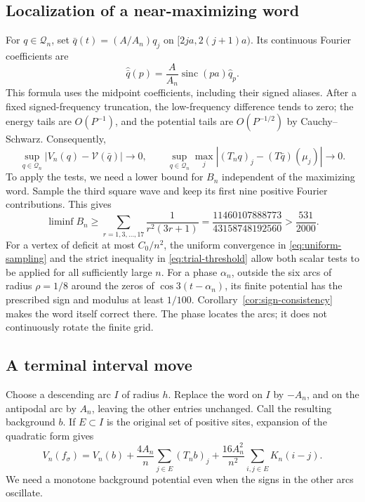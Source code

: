 \documentclass[11pt,reqno]{amsart}
\numberwithin{equation}{section}
\theoremstyle{definition}
\theoremstyle{remark}
\newcommand{\V}{\mathcal V}
\DeclareMathOperator{\sinc}{sinc}
\begin{document}
\subsection{Localization of a near-maximizing word}
For $q\in\mathcal Q_n$, set $\bar q(t)=(A/A_n)q_j$ on $[2ja,2(j+1)a)$. Its continuous Fourier coefficients are
\[
 \widehat{\bar q}(p)=\frac A{A_n}\sinc(pa)\widehat q_p.
\]
This formula uses the midpoint coefficients, including their signed aliases. After a fixed signed-frequency truncation, the low-frequency difference tends to zero; the energy tails are $O(P^{-1})$, and the potential tails are $O(P^{-1/2})$ by Cauchy--Schwarz. Consequently,
\begin{equation}\label{eq:uniform-sampling}
 \sup_{q\in\mathcal Q_n}|V_n(q)-\V(\bar q)|\to0,
 \qquad
 \sup_{q\in\mathcal Q_n}\max_j|(T_nq)_j-(T\bar q)(\mu_j)|\to0.
\end{equation}
To apply the tests, we need a lower bound for $B_n$ independent of the maximizing word. Sample the third square wave and keep its first nine positive Fourier contributions. This gives
\begin{equation}\label{eq:trial-threshold}
 \liminf B_n\ge\sum_{r=1,3,\ldots,17}\frac1{r^2(3r+1)}
 =\frac{11460107888773}{43158748192560}>\frac{531}{2000}.
\end{equation}
For a vertex of deficit at most $C_0/n^2$, the uniform convergence in \eqref{eq:uniform-sampling} and the strict inequality in \eqref{eq:trial-threshold} allow both scalar tests to be applied for all sufficiently large $n$. For a phase $\alpha_n$, outside the six arcs of radius $\rho=1/8$ around the zeros of $\cos3(t-\alpha_n)$, its finite potential has the prescribed sign and modulus at least $1/100$. Corollary~\ref{cor:sign-consistency} makes the word itself correct there. The phase locates the arcs; it does not continuously rotate the finite grid.


\subsection{A terminal interval move}
Choose a descending arc $I$ of radius $h$. Replace the word on $I$ by $-A_n$, and on the antipodal arc by $A_n$, leaving the other entries unchanged. Call the resulting background $b$. If $E\subset I$ is the original set of positive sites, expansion of the quadratic form gives
\begin{equation}\label{eq:compression-expansion}
 V_n(f_\sigma)=V_n(b)+\frac{4A_n}{n}\sum_{j\in E}(T_nb)_j
       +\frac{16A_n^2}{n^2}\sum_{i,j\in E}K_n(i-j).
\end{equation}
We need a monotone background potential even when the signs in the other arcs oscillate.
\end{document}
